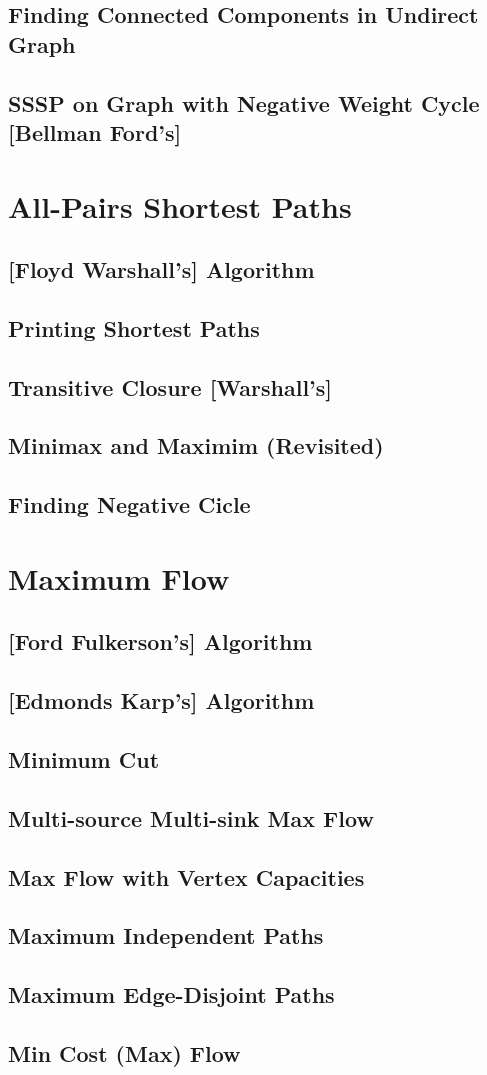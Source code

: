 	\subsection {Finding Connected Components in Undirect Graph}
		
	\subsection {SSSP on Graph with Negative Weight Cycle [Bellman Ford's]}
\section {All-Pairs Shortest Paths}
	\subsection {[Floyd Warshall's] Algorithm}
	\subsection {Printing Shortest Paths}
	\subsection {Transitive Closure [Warshall's]}
	\subsection {Minimax and Maximim (Revisited)}
	\subsection {Finding Negative Cicle}
\section {Maximum Flow}
	\subsection {[Ford Fulkerson's] Algorithm}
	\subsection {[Edmonds Karp's] Algorithm}
	\subsection {Minimum Cut}
	\subsection {Multi-source Multi-sink Max Flow}
	\subsection {Max Flow with Vertex Capacities}
	\subsection {Maximum Independent Paths}
	\subsection {Maximum Edge-Disjoint Paths}
	\subsection {Min Cost (Max) Flow}
